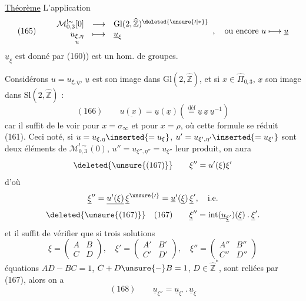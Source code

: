 \uline{Théorème} L'application
\[
(165)\qquad
\begin{array}{rcl}
\mathcal M_{0,3}^{!\sim}[0]&\longrightarrow&
\mathrm{Gl}(2,\widehat{\mathbb Z})^{\deleted{\unsure{\prime|*}}}\\
\underset{u}{u_{\xi,\eta}}&\longmapsto&\underline u_\xi
\end{array},
\quad\text{ou encore }u\longmapsto\underline u
\]
$\underline u_\xi$ est donné par (160)) est un hom. de groupes.



Considérons $u=u_{\xi,\eta}$,
$\underline u$ est son image dans $\mathrm{Gl}(2,\widehat{\mathbb Z})$,
et si $x\in\widehat\Pi_{0,3}$, $\underline x$
son image dans $\mathrm{Sl}(2,\widehat{\mathbb Z})$ :
\[
(166)\qquad
\underline{u(x)}=\underline u(\underline x)
\left(\stackrel{\text{déf}}{=}
\underline u\,\underline x\,\underline u^{-1}\right)
\]
car il suffit de le voir pour $x=\sigma_\infty$ et pour $x=\rho$,
où cette formule se réduit  (161). Ceci noté,
si $u=u_{\xi,\eta}\inserted{=u_\xi}$,
$u'=u_{\xi',\eta'}\inserted{=u_{\xi'}}$
sont deux éléments de $\mathcal M_{0,3}^{!\sim}(0)$,
$u''=u_{\xi'',\eta''}=u_{\xi''}$ leur produit, on aura
\[
\deleted{\unsure{(167)}}\qquad\xi''=u'(\xi)\xi'
\]
d'où
\[
\underline\xi''=\underline{u'(\xi)}\,\underline\xi^{\unsure{\prime}}
=\underline u'(\underline\xi)\,\underline\xi',\quad\text{i.e.}
\]
\[
\deleted{\unsure{(167)}}\quad(167)\qquad
\underline\xi''=\operatorname{int}
(\underline u_{\underline\xi'})(\underline\xi)\mathbin{.}\underline\xi'.
\]
et il suffit de vérifier que si trois solutions
\[
\xi=\begin{pmatrix}A&B\\C&D\end{pmatrix},
\quad\xi'=\begin{pmatrix}A'&B'\\C'&D'\end{pmatrix},
\quad\xi''=\begin{pmatrix}A''&B''\\C''&D''\end{pmatrix}
\]
 équations
$AD-BC=1$, $C+D\unsure{-}B=1$, $D\in\widehat{\mathbb Z}^{*}$,
sont reliées par (167), alors on a
\[
(168)\qquad
\underline u_{\xi''}=\underline u_{\xi'}\mathbin{.}\underline u_\xi
\]

